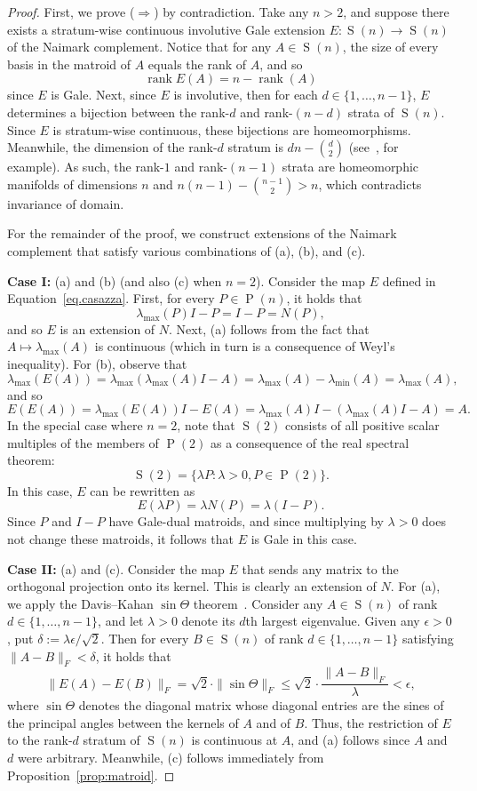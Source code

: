 \documentclass[10pt,a4paper]{amsart}
\newcommand{\oP}{\operatorname{P}}
\newcommand{\oS}{\operatorname{S}}
\begin{document}
\begin{proof}
First, we prove ($\Rightarrow$) by contradiction.
Take any $n>2$, and suppose there exists a stratum-wise continuous involutive Gale extension $E\colon\oS(n)\to\oS(n)$ of the Naimark complement.
Notice that for any $A\in\oS(n)$, the size of every basis in the matroid of $A$ equals the rank of $A$, and so
\[
\operatorname{rank}E(A)
=n-\operatorname{rank}(A)
\]
since $E$ is Gale.
Next, since $E$ is involutive, then for each $d\in\{1,\ldots,n-1\}$, $E$ determines a bijection between the rank-$d$ and rank-$(n-d)$ strata of $\oS(n)$.
Since $E$ is stratum-wise continuous, these bijections are homeomorphisms.
Meanwhile, the dimension of the rank-$d$ stratum is $dn-\binom{d}{2}$ (see~\cite{BonnabelS:10}, for example).
As such, the rank-$1$ and rank-$(n-1)$ strata are homeomorphic manifolds of dimensions $n$ and $n(n-1)-\binom{n-1}{2}>n$, which contradicts invariance of domain.

For the remainder of the proof, we construct extensions of the Naimark complement that satisfy various combinations of (a), (b), and (c).

\medskip
\noindent
\textbf{Case I:} (a) and (b) (and also (c) when $n=2$).
Consider the map $E$ defined in Equation~\eqref{eq.casazza}.
First, for every $P\in\oP(n)$, it holds that
\[
\lambda_{\max}(P)I-P
=I-P
=N(P),
\]
and so $E$ is an extension of $N$.
Next, (a) follows from the fact that $A\mapsto\lambda_{\max}(A)$ is continuous (which in turn is a consequence of Weyl's inequality).
For (b), observe that
\[
\lambda_{\max}(E(A))
=\lambda_{\max}(\lambda_{\max}(A)I-A)
=\lambda_{\max}(A)-\lambda_{\min}(A)
=\lambda_{\max}(A),
\]
and so
\[
E(E(A))
=\lambda_{\max}(E(A))I-E(A)
=\lambda_{\max}(A)I-(\lambda_{\max}(A)I-A)
=A.
\]
In the special case where $n=2$, note that $\oS(2)$ consists of all positive scalar multiples of the members of $\oP(2)$ as a consequence of the real spectral theorem:
\[
\oS(2)
=\{\lambda P:\lambda>0,P\in\oP(2)\}.
\]
In this case, $E$ can be rewritten as
\[
E(\lambda P)=\lambda N(P)=\lambda(I-P).
\]
Since $P$ and $I-P$ have Gale-dual matroids, and since multiplying by $\lambda>0$ does not change these matroids, it follows that $E$ is Gale in this case.

\medskip
\noindent
\textbf{Case II:} (a) and (c).
Consider the map $E$ that sends any matrix to the orthogonal projection onto its kernel.
This is clearly an extension of $N$.
For (a), we apply the Davis--Kahan $\sin\Theta$ theorem~\cite{DavisK:70}.
Consider any $A\in\oS(n)$ of rank $d\in\{1,\ldots,n-1\}$, and let $\lambda>0$ denote its $d$th largest eigenvalue.
Given any $\epsilon>0$, put $\delta:=\lambda\epsilon/\sqrt{2}$.
Then for every $B\in\oS(n)$ of rank $d\in\{1,\ldots,n-1\}$ satisfying $\|A-B\|_F<\delta$, it holds that
\[
\|E(A)-E(B)\|_F
=\sqrt{2}\cdot\|\sin\Theta\|_F
\leq\sqrt{2}\cdot\frac{\|A-B\|_F}{\lambda}
<\epsilon,
\]
where $\sin\Theta$ denotes the diagonal matrix whose diagonal entries are the sines of the principal angles between the kernels of $A$ and of $B$.
Thus, the restriction of $E$ to the rank-$d$ stratum of $\oS(n)$ is continuous at $A$, and (a) follows since $A$ and $d$ were arbitrary.
Meanwhile, (c) follows immediately from Proposition~\ref{prop:matroid}.


\end{proof}
\end{document}
